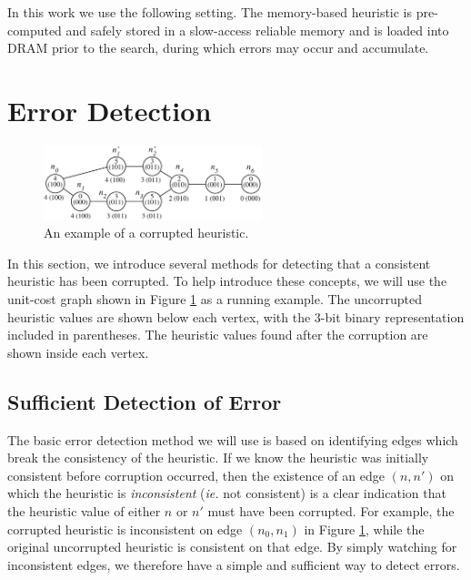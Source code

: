 \documentclass[letterpaper]{article}
\begin{document}
In this work we use the following setting. The memory-based heuristic is pre-computed and safely stored in a slow-access reliable memory and is loaded into DRAM
prior to the search, during which errors may occur and accumulate.







\section{Error Detection}


\begin{figure}[t]
\begin{center}
\includegraphics[width=240px]{figures/corruption_example5.pdf}
\caption{An example of a corrupted heuristic.}
\label{fig:corruption_example}
\end{center}
\end{figure}

In this section, we introduce several methods for detecting that a consistent heuristic has been corrupted.
To help introduce these concepts, we will use the unit-cost graph shown in Figure \ref{fig:corruption_example} as a running example.
The uncorrupted heuristic values are shown below each vertex, with the 3-bit binary representation included in parentheses. The heuristic values found after the corruption are shown inside each vertex.

\subsection{Sufficient Detection of Error}

The basic error detection method we will use is based on identifying edges which break the consistency of the heuristic.
If we know the heuristic was initially consistent before corruption occurred, then the existence of an edge $(n, n')$ on which the heuristic is \textit{inconsistent} (\textit{ie.} not consistent) is a clear indication that the heuristic value of either $n$ or $n'$ must have been corrupted.
For example, the corrupted heuristic is inconsistent on edge $(n_0, n_1)$ in Figure \ref{fig:corruption_example}, while the original uncorrupted heuristic is consistent on that edge.
By simply watching for inconsistent edges, we therefore have a simple and sufficient way to detect errors.
\end{document}
